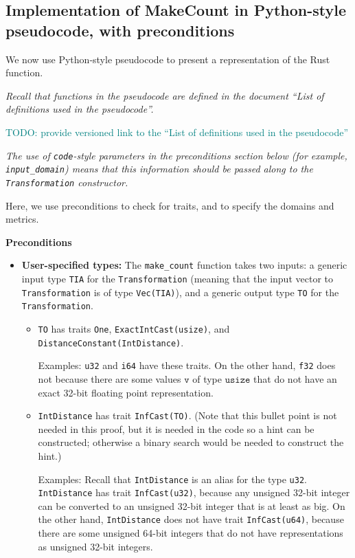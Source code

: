 \documentclass[12pt,letterpaper]{article}
\newcommand{\todo}[1]{{\begin{center} \textcolor{teal}{{\huge TODO:} #1}\end{center}}}
\theoremstyle{definition}
\begin{document}
\subsection{Implementation of MakeCount in Python-style pseudocode, with preconditions}
\label{sec:python-pseudocode}

We now use Python-style pseudocode to present a representation of the Rust function.

\emph{Recall that functions in the pseudocode are defined in the document ``List of definitions used in the pseudocode''.}

\todo{provide versioned link to the ``List of definitions used in the pseudocode''}


\emph{The use of \texttt{code}-style parameters in the preconditions section below (for example, \texttt{input\_domain}) means that this information should be passed along to the \texttt{Transformation} constructor.}

Here, we use preconditions to check for traits, and to specify the domains and metrics.

\textbf{Preconditions}
\begin{itemize}
    \item \textbf{User-specified types:} The \texttt{make\_count} function takes two inputs: a generic input type \texttt{TIA} for the \texttt{Transformation} (meaning that the input vector to \texttt{Transformation} is of type \texttt{Vec(TIA)}), and a generic output type \texttt{TO} for the \texttt{Transformation}.
    
    \begin{itemize}
        \item \texttt{TO} has traits \texttt{One}, \texttt{ExactIntCast(usize)}, and \texttt{DistanceConstant(IntDistance)}.
        
        Examples: \texttt{u32} and \texttt{i64} have these traits. On the other hand, \texttt{f32} does not because there are some values $\texttt{v}$ of type $\texttt{usize}$ that do not have an exact 32-bit floating point representation.
        
        \item \texttt{IntDistance} has trait \texttt{InfCast(TO)}. (Note that this bullet point is not needed in this proof, but it is needed in the code so a hint can be constructed; otherwise a binary search would be needed to construct the hint.)
        
        Examples: Recall that \texttt{IntDistance} is an alias for the type \texttt{u32}. \texttt{IntDistance} has trait \texttt{InfCast(u32)}, because any unsigned 32-bit integer can be converted to an unsigned 32-bit integer that is at least as big. On the other hand, \texttt{IntDistance} does not have trait \texttt{InfCast(u64)}, because there are some unsigned 64-bit integers that do not have representations as unsigned 32-bit integers.
        
    \end{itemize}
\end{itemize}
\end{document}

